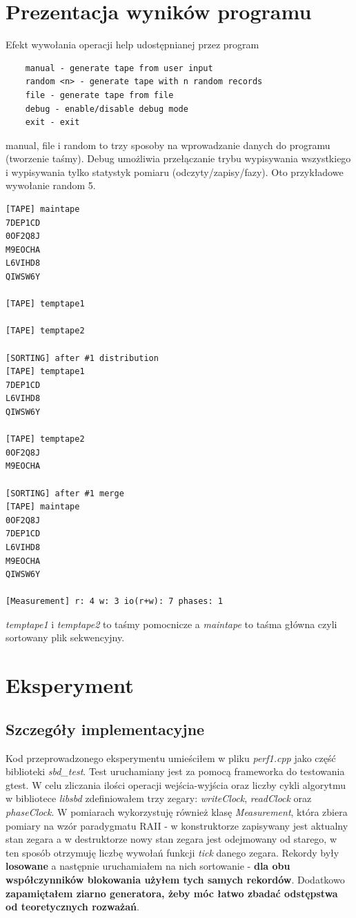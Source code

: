 \documentclass{article}
\begin{document}
\section{Prezentacja wyników programu}
Efekt wywołania operacji help udostępnianej przez program
\begin{lstlisting}
	manual - generate tape from user input
	random <n> - generate tape with n random records
	file - generate tape from file
	debug - enable/disable debug mode
	exit - exit
\end{lstlisting}
manual, file i random to trzy sposoby na wprowadzanie danych do programu (tworzenie taśmy). Debug umożliwia
przełączanie trybu wypisywania wszystkiego i wypisywania tylko statystyk pomiaru (odczyty/zapisy/fazy).  Oto 
przykładowe wywołanie random 5.
\begin{lstlisting}
[TAPE] maintape
7DEP1CD
0OF2Q8J
M9EOCHA
L6VIHD8
QIWSW6Y

[TAPE] temptape1

[TAPE] temptape2

[SORTING] after #1 distribution 
[TAPE] temptape1
7DEP1CD
L6VIHD8
QIWSW6Y

[TAPE] temptape2
0OF2Q8J
M9EOCHA

[SORTING] after #1 merge 
[TAPE] maintape
0OF2Q8J
7DEP1CD
L6VIHD8
M9EOCHA
QIWSW6Y

[Measurement] r: 4 w: 3 io(r+w): 7 phases: 1
\end{lstlisting}
\textit{temptape1} i \textit{temptape2} to taśmy pomocnicze a \textit{maintape} to taśma główna czyli sortowany plik sekwencyjny.
\section{Eksperyment}
\subsection{Szczegóły implementacyjne}
Kod przeprowadzonego eksperymentu umieściłem w pliku \textit{perf1.cpp} jako część biblioteki \textit{sbd\_test}. Test uruchamiany jest za pomocą frameworka do
testowania gtest. W celu zliczania ilości operacji wejścia-wyjścia oraz liczby cykli algorytmu w bibliotece \textit{libsbd} zdefiniowałem trzy zegary: 
\textit{writeClock}, \textit{readClock} oraz \textit{phaseClock}. W pomiarach wykorzystuję również klasę \textit{Measurement}, która zbiera pomiary na wzór paradygmatu RAII - w 
konstruktorze zapisywany jest aktualny stan zegara a w destruktorze nowy stan zegara jest odejmowany od starego, w ten sposób otrzymuję liczbę
wywołań funkcji \textit{tick} danego zegara. Rekordy były \textbf{losowane} a następnie uruchamiałem na nich
sortowanie - \textbf{dla obu współczynników blokowania użyłem tych samych rekordów}. Dodatkowo \textbf{zapamiętałem
ziarno generatora, żeby móc łatwo zbadać odstępstwa od teoretycznych rozważań}.
\end{document}

